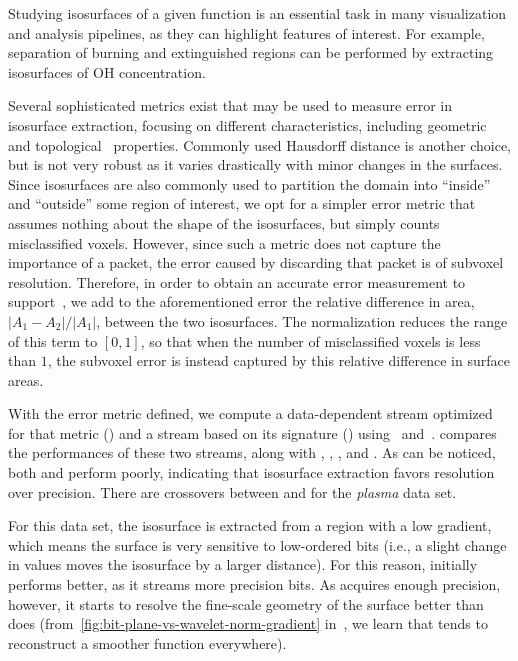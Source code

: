 Studying isosurfaces of a given function is an essential task in many visualization and analysis
pipelines, as they can highlight features of interest. For example, separation of burning and
extinguished regions can be performed by extracting isosurfaces of OH concentration.

Several sophisticated metrics exist that may be used to measure error in isosurface extraction,
focusing on different characteristics, including geometric~\cite{verifiable-isosurface} and
topological~\cite{topology-verification-isosurface} properties. Commonly used Hausdorff distance is
another choice, but is not very robust as it varies drastically with minor changes in the surfaces.
Since isosurfaces are also commonly used to partition the domain into ``inside'' and ``outside''
some region of interest, we opt for a simpler error metric that assumes nothing about the shape of
the isosurfaces, but simply counts misclassified voxels. However, since such a metric does not
capture the importance of a packet, the error caused by discarding that packet is of subvoxel
resolution. Therefore, in order to obtain an accurate error measurement to
support~, we add to the aforementioned error the relative difference in area,
$|A_1-A_2|/|A_1|$, between the two isosurfaces. The normalization reduces the range of this term to
$[0, 1]$, so that when the number of misclassified voxels is less than $1$, the subvoxel error is
instead captured by this relative difference in surface areas.

With the error metric defined, we compute a data-dependent stream optimized for that metric (\siop)
and a stream based on its signature (\sisg) using~ and~.
 compares the performances of these two streams, along with \sbit, \slvl,
\swav, and \smag. As can be noticed, both \slvl and \smag perform poorly, indicating that
isosurface extraction favors resolution over precision. There are crossovers between \sbit and \swav
for the \emph{plasma} data set.

For this data set, the isosurface is extracted from a region with a low gradient, which means the
surface is very sensitive to low-ordered bits (i.e., a slight change in values moves the isosurface
by a larger distance). For this reason, \swav initially performs better, as it streams more precision
bits. As \sbit acquires enough precision, however, it starts to resolve the fine-scale geometry of
the surface better than \swav does (from~\autoref{fig:bit-plane-vs-wavelet-norm-gradient}
in~, we learn that \swav tends to reconstruct a smoother function everywhere).

